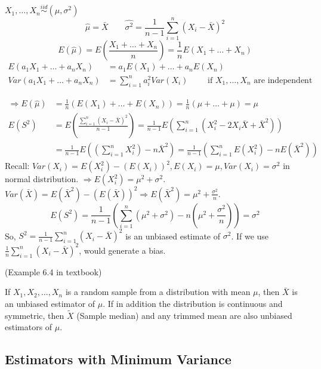\begin{exmp}
$X_1,\dots,X_n \overset{iid}{\sim} (\mu,\sigma^2)$
\[\hat{\mu}=\bar{X} \qquad \hat{\sigma^2}=\frac{1}{n-1}\sum_{i=1}^n(X_i-\bar{X})^2\]
\[E(\hat{\mu})=E(\frac{X_1+\dots+X_n}{n})=\frac{1}{n}E(X_1+\dots+X_n)\]
\begin{align*}
E(a_1 X_1+\dots+a_n X_n)&=a_1E(X_1)+\dots +a_n E(X_n)\\
Var(a_1 X_1+\dots+a_n X_n)&=\sum_{i=1}^n a_i^2 Var(X_i) \qquad \text{ if }X_1,\dots,X_n \text{ are independent  }  
\end{align*}

\begin{align*}
\Rightarrow E(\hat{\mu})&=\frac{1}{n}(E(X_1)+\dots+E(X_n))=\frac{1}{n}(\mu+\dots+\mu)=\mu \\
 E(S^2)&= E\left(\frac{\sum_{i=1}^n(X_i-\bar{X})^2}{n-1}\right)= \frac{1}{n-1} E\left(\sum_{i=1}^n (X_i^2 -2X_i \bar{X}+\bar{X}^2) \right) \\
 &= \frac{1}{n-1} E\left( \left(\sum_{i=1}^n X_i^2 \right) - n \bar{X}^2 \right) = \frac{1}{n-1} \left( \sum_{i=1}^n E ( X_i^2 ) - n E(\bar{X}^2) \right)
\end{align*}
Recall: $Var(X_i)=E(X_i^2)-(E(X_i))^2, E(X_i)=\mu, Var(X_i)=\sigma^2$ in normal distribution. $\Rightarrow E(X_i^2)=\mu^2+\sigma^2$. $Var(\bar{X})=E(\bar{X}^2)-(E(\bar{X}))^2 \Rightarrow E(\bar{X}^2)=\mu^2 +\frac{\sigma^2}{n}$.
\[E(S^2)=\frac{1}{n-1} \left( \sum_{i=1}^n (\mu^2+\sigma^2) - n \left(\mu^2 +\frac{\sigma^2}{n}\right) \right)=\sigma^2 \]
So, $S^2=\frac{1}{n-1}\sum_{i=1}^n(X_i-\bar{X})^2$ is an unbiased estimate of $\sigma^2$. If we use $\frac{1}{n}\sum_{i=1}^n(X_i-\bar{X})^2$, would generate a bias.
\end{exmp}

\begin{exmp}
(Example 6.4 in textbook)
\end{exmp}

\begin{prop}
If $X_1, X_2,\dots, X_n$ is a random sample from a distribution with mean $\mu$, then $\bar{X}$ is an unbiased estimator of $\mu$. If in addition the distribution is continuous and symmetric, then $\tilde{X}$ (Sample median) and any trimmed mean are also unbiased estimators of $\mu$.
\end{prop}

\subsection{Estimators with Minimum Variance}
\noindent{}

